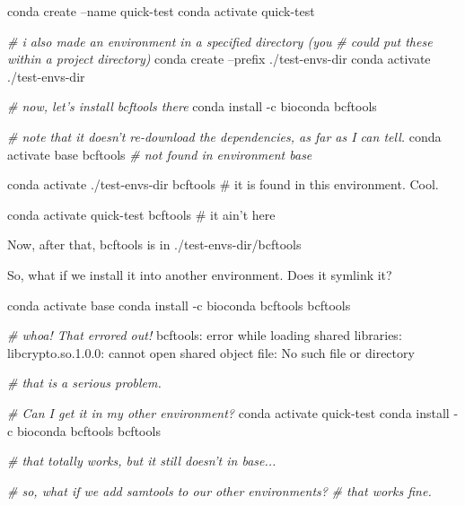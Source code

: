 \documentclass[]{krantz}
\makeatletter
\newenvironment{Shaded}{\begin{snugshade}}{\end{snugshade}}
\newcommand{\CommentTok}[1]{\textcolor[rgb]{0.37,0.37,0.37}{\textit{#1}}}
\newcommand{\ExtensionTok}[1]{#1}
\newcommand{\NormalTok}[1]{#1}
\newcommand{\StringTok}[1]{\textcolor[rgb]{0.5,0.5,0.5}{#1}}
\newenvironment{kframe}{%
\medskip{}
\setlength{\fboxsep}{.8em}
 \def\at@end@of@kframe{}%
 \ifinner\ifhmode%
  \def\at@end@of@kframe{\end{minipage}}%
  \begin{minipage}{\columnwidth}%
 \fi\fi%
 \def\FrameCommand##1{\hskip\@totalleftmargin \hskip-\fboxsep
 \colorbox{shadecolor}{##1}\hskip-\fboxsep
     \hskip-\linewidth \hskip-\@totalleftmargin \hskip\columnwidth}%
 \MakeFramed {\advance\hsize-\width
   \@totalleftmargin\z@ \linewidth\hsize
   \@setminipage}}%
 {\par\unskip\endMakeFramed%
 \at@end@of@kframe}
\renewenvironment{Shaded}{\begin{kframe}}{\end{kframe}}
\makeatother
\begin{document}
\begin{Shaded}
\begin{Highlighting}[]
\ExtensionTok{conda}\NormalTok{ create --name quick-test}
\ExtensionTok{conda}\NormalTok{ activate quick-test}

\CommentTok{# i also made an environment in a specified directory (you}
\CommentTok{# could put these within a project directory)}
\ExtensionTok{conda}\NormalTok{ create --prefix ./test-envs-dir }
\ExtensionTok{conda}\NormalTok{ activate ./test-envs-dir}

\CommentTok{# now, let's install bcftools there}
\ExtensionTok{conda}\NormalTok{ install -c bioconda bcftools}

\CommentTok{# note that it doesn't re-download the dependencies, as far as I can tell.}
\ExtensionTok{conda}\NormalTok{ activate base}
\ExtensionTok{bcftools} \CommentTok{# not found in environment base}

\ExtensionTok{conda}\NormalTok{ activate ./test-envs-dir}
\ExtensionTok{bcftools}\NormalTok{  # it is found in this environment.  Cool.}

\ExtensionTok{conda}\NormalTok{ activate quick-test}
\ExtensionTok{bcftools}\NormalTok{  # it ain}\StringTok{'t here}
\end{Highlighting}
\end{Shaded}

Now, after that, bcftools is in ./test-envs-dir/bcftools

So, what if we install it into another environment. Does it symlink it?

\begin{Shaded}
\begin{Highlighting}[]
\ExtensionTok{conda}\NormalTok{ activate base}
\ExtensionTok{conda}\NormalTok{ install -c bioconda bcftools}
\ExtensionTok{bcftools}

\CommentTok{# whoa! That errored out!}
\ExtensionTok{bcftools}\NormalTok{: error while loading shared libraries: libcrypto.so.1.0.0: cannot open shared object file: No such file or directory}

\CommentTok{# that is a serious problem.  }

\CommentTok{# Can I get it in my other environment?}
\ExtensionTok{conda}\NormalTok{ activate quick-test}
\ExtensionTok{conda}\NormalTok{ install -c bioconda bcftools}
\ExtensionTok{bcftools}

\CommentTok{# that totally works, but it still doesn't in base...}

\CommentTok{# so, what if we add samtools to our other environments?}
\CommentTok{# that works fine.}
\end{Highlighting}
\end{Shaded}
\end{document}
